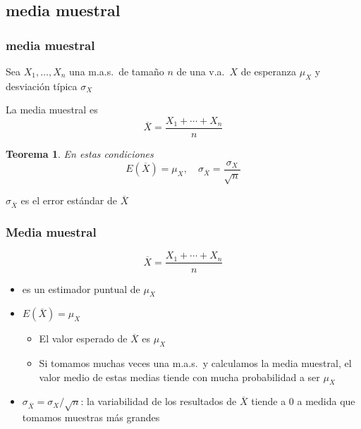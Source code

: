 \documentclass[12pt,t]{beamer}\usepackage[]{graphicx}\usepackage[]{color}
\renewcommand{\emph}[1]{{\color{red}#1}}
\theoremstyle{plain}
\newtheorem{teorema}{Teorema}
\theoremstyle{definition}
\begin{document}
%



\subsection{media muestral}
\begin{frame}
\frametitle{media muestral}

Sea $X_1,\ldots, X_n$ una m.a.s.\ de tamaño $n$ de una v.a.\ $X$ de esperanza $\mu_X$ y desviación típica $\sigma_X$
\medskip

La \emph{media muestral} es
$$
\overline{X}=\frac{X_1+\cdots+X_n}{n}
$$

\begin{teorema}
En estas condiciones
$$
E(\overline{X})=\mu_X,\quad \sigma_{\overline{X}}=\frac{\sigma_X}{\sqrt{n}}
$$
\end{teorema}

 $\sigma_{\overline{X}}$ es el \emph{error estándar} de $\overline{X}$



\end{frame}

\begin{frame}
\frametitle{Media muestral}

$$
\overline{X}=\frac{X_1+\cdots+X_n}{n}
$$
\begin{itemize}
\item es un estimador puntual de $\mu_X$
\medskip

\item \emph{$E(\overline{X})=\mu_X$}
\begin{itemize}
\item El valor esperado de $\overline{X}$ es $\mu_X$
\medskip

\item Si tomamos muchas veces una m.a.s.\ y calculamos la media muestral, el valor medio  de estas medias tiende con mucha probabilidad a ser $\mu_X$
\end{itemize}
\bigskip

\item \emph{$\sigma_{\overline{X}}= \sigma_X/\sqrt{n}$}: la variabilidad de los resultados de $\overline{X}$ tiende a 0  a medida que tomamos muestras más grandes 
\end{itemize}

\end{frame}
\end{document}
